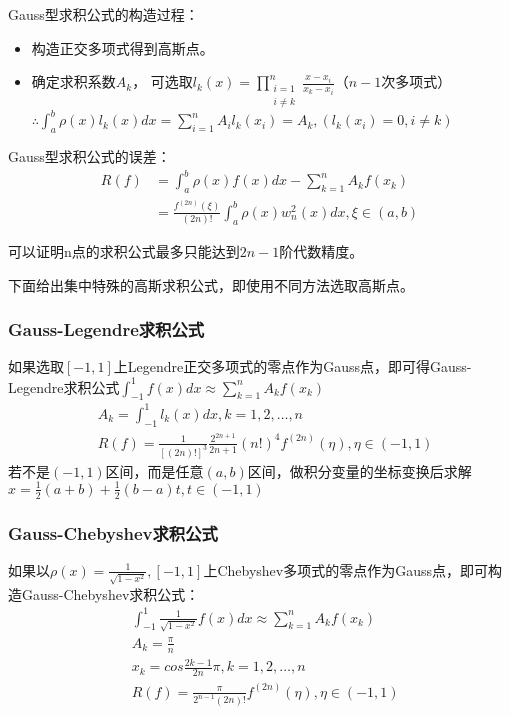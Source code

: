 \documentclass[a4paper]{article}
\begin{document}
Gauss型求积公式的构造过程：
\begin{itemize}
    \item 构造正交多项式得到高斯点。
    \item 确定求积系数$A_k$，
        可选取$l_k(x)=\prod^n_{\substack{i=1\\i\neq k}}\frac{x-x_i}{x_k-x_i} $（$n-1$次多项式）\\
        $\therefore \int^b_a\rho(x)l_k(x)dx=\sum^n_{i=1}A_il_k(x_i)=A_k, (l_k(x_i)=0, i\neq k)$
\end{itemize}

Gauss型求积公式的误差：
\begin{equation*}
    \begin{split}
        R(f)&=\int^b_a\rho(x)f(x)dx - \sum^n_{k=1}A_kf(x_k) \\
        &= \frac{f^{(2n)}(\xi)}{(2n)!}\int^b_a\rho(x)w_n^2(x)dx, \xi \in (a,b)
    \end{split}
\end{equation*}

可以证明n点的求积公式最多只能达到$2n-1$阶代数精度。

下面给出集中特殊的高斯求积公式，即使用不同方法选取高斯点。

\subsubsection{Gauss-Legendre求积公式}
如果选取$[-1,1]$上Legendre正交多项式的零点作为Gauss点，即可得Gauss-Legendre求积公式$\int^1_{-1}f(x)dx\approx \sum^n_{k=1}A_kf(x_k) $
\begin{align}
    &A_k=\int^1_{-1}l_k(x)dx, k=1,2,\dots, n \\
    &R(f) = \frac{1}{[(2n)!]^3}\frac{2^{2n+1}}{2n+1}(n!)^4f^{(2n)}(\eta), \eta \in (-1,1)
\end{align}
若不是$(-1,1)$区间，而是任意$(a,b)$区间，做积分变量的坐标变换后求解$x=\frac{1}{2}(a+b)+\frac{1}{2}(b-a)t, t\in(-1,1)$

\subsubsection{Gauss-Chebyshev求积公式}
如果以$\rho(x)=\frac{1}{\sqrt{1-x^2}},[-1,1]$上Chebyshev多项式的零点作为Gauss点，即可构造Gauss-Chebyshev求积公式：
\begin{align*}
    &\int^1_{-1}\frac{1}{\sqrt{1-x^2}}f(x)dx \approx \sum^n_{k=1}A_kf(x_k) \\
    &A_k=\frac{\pi}{n} \\
    &x_k=cos\frac{2k-1}{2n}\pi, k=1,2,\dots,n\\
    &R(f) = \frac{\pi}{2^{n-1}(2n)!}f^{(2n)}(\eta), \eta \in(-1,1)
\end{align*}
\end{document}
